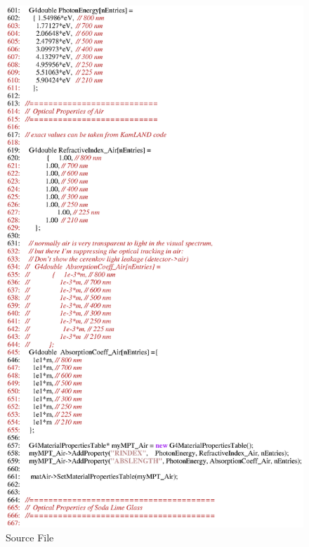 \begin{figure}[h]
  \hspace{0cm}
  \includegraphics[scale=0.8]{./figures17/QweakSimMaterial.cc-p10.eps}
  \caption{\label{SourceXVII11} Source File}
           \label{fig:XVII-SC-11}
\end{figure}
\clearpage

